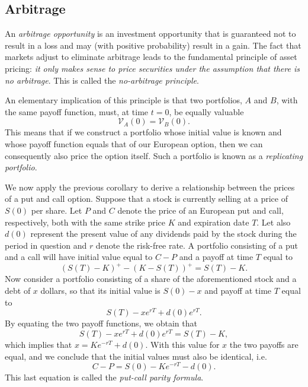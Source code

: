 \documentclass[]{article}
\theoremstyle{definition}
\theoremstyle{remark}
\begin{document}
\subsection{Arbitrage}
\par
An \textit{arbitrage opportunity} is an investment opportunity that is guaranteed not to result in a loss and may (with positive probability) result in a gain. The fact that markets adjust to eliminate arbitrage leads to the fundamental principle of asset pricing: \textit{it only makes sense to price securities under the assumption that there is no arbitrage}. This is called the \textit{no-arbitrage principle}.
\par 
An elementary implication of this principle is that two portfolios, $A$ and $B$, with the same payoff function, must, at time $t=0$, be equally valuable
\[\mathcal{V}_{A}(0) = \mathcal{V}_B (0). \]
This means that if we construct a portfolio whose initial value is known and whose payoff function equals that of our European option, then we can consequently also price the option itself. Such a portfolio is known as a \textit{replicating portfolio}.
\par We now apply the previous corollary to derive a relationship between the prices of a put and call option. Suppose that a stock is currently selling at a price of $S(0)$ per share. Let $P$ and $C$ denote the price of an European put and call, respectively, both with the same strike price $K$ and expiration date $T$. Let also $d(0)$ represent the present value of any dividends paid by the stock during the period in question and $r$ denote the risk-free rate. A portfolio consisting of a put and a call will have initial value equal to $C-P$ and a payoff at time $T$ equal to
\[(S(T) - K)^+ -(K-S(T))^+ = S(T)-K.\]
Now consider a portfolio consisting of a share of the aforementioned stock and a debt of $x$ dollars, so that its initial value is $S(0)-x$ and payoff at time $T$ equal to
\[  S(T) - x e^{rT} +d(0) e^{r T}. \]
By equating the two payoff functions, we obtain that
\[
S(T) - x e^{rT} +d(0) e^{r T} = S(T) - K,
\]
which implies that $x=K e^{-rT} + d(0)$. With this value for $x$ the two payoffs are equal, and we conclude that the initial values must also be identical, i.e.
\[ C-P = S(0) - Ke^{-rT} - d(0). \]
This last equation is called the \textit{put-call parity formula}.
\end{document}
